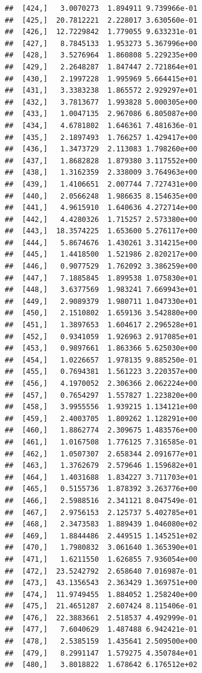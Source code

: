 \documentclass[article]{jss}\usepackage[]{graphicx}\usepackage[]{xcolor}
\makeatletter
\newenvironment{kframe}{%
 \def\at@end@of@kframe{}%
 \ifinner\ifhmode%
  \def\at@end@of@kframe{\end{minipage}}%
  \begin{minipage}{\columnwidth}%
 \fi\fi%
 \def\FrameCommand##1{\hskip\@totalleftmargin \hskip-\fboxsep
 \colorbox{shadecolor}{##1}\hskip-\fboxsep
     \hskip-\linewidth \hskip-\@totalleftmargin \hskip\columnwidth}%
 \MakeFramed {\advance\hsize-\width
   \@totalleftmargin\z@ \linewidth\hsize
   \@setminipage}}%
 {\par\unskip\endMakeFramed%
 \at@end@of@kframe}
\newenvironment{knitrout}{}{} %
\makeatother
\begin{document}
\begin{knitrout}
\begin{kframe}
\begin{verbatim}
##  [424,]   3.0070273  1.894911 9.739966e-01
##  [425,]  20.7812221  2.228017 3.630560e-01
##  [426,]  12.7229842  1.779055 9.633231e-01
##  [427,]   8.7845133  1.953273 5.367996e+00
##  [428,]   3.5276964  1.860808 5.229235e+00
##  [429,]   2.2648287  1.847447 2.721864e+01
##  [430,]   2.1997228  1.995969 5.664415e+01
##  [431,]   3.3383238  1.865572 2.929297e+01
##  [432,]   3.7813677  1.993828 5.000305e+00
##  [433,]   1.0047135  2.967086 6.805087e+00
##  [434,]   4.6781802  1.646361 7.481636e-01
##  [435,]   2.1897493  1.766257 1.429417e+00
##  [436,]   1.3473729  2.113083 1.798260e+00
##  [437,]   1.8682828  1.879380 3.117552e+00
##  [438,]   1.3162359  2.338009 3.764963e+00
##  [439,]   1.4106651  2.007744 7.727431e+00
##  [440,]   2.0566248  1.986635 8.154635e+00
##  [441,]   4.9615910  1.640636 4.272714e+00
##  [442,]   4.4280326  1.715257 2.573380e+00
##  [443,]  18.3574225  1.653600 5.276117e+00
##  [444,]   5.8674676  1.430261 3.314215e+00
##  [445,]   1.4418500  1.521986 2.820217e+00
##  [446,]   0.9077529  1.762092 3.386259e+00
##  [447,]   7.1885845  1.899538 1.075830e+01
##  [448,]   3.6377569  1.983241 7.669943e+01
##  [449,]   2.9089379  1.980711 1.047330e+01
##  [450,]   2.1510802  1.659136 3.542880e+00
##  [451,]   1.3897653  1.604617 2.296528e+01
##  [452,]   0.9341059  1.926963 2.917085e+01
##  [453,]   0.9897661  1.863366 5.625030e+00
##  [454,]   1.0226657  1.978135 9.885250e-01
##  [455,]   0.7694381  1.561223 3.220357e+00
##  [456,]   4.1970052  2.306366 2.062224e+00
##  [457,]   0.7654297  1.557827 1.223820e+00
##  [458,]   3.9955556  1.939215 1.134121e+00
##  [459,]   2.4003705  1.809262 1.128291e+00
##  [460,]   1.8862774  2.309675 1.483576e+00
##  [461,]   1.0167508  1.776125 7.316585e-01
##  [462,]   1.0507307  2.658344 2.091677e+01
##  [463,]   1.3762679  2.579646 1.159682e+01
##  [464,]   1.4031688  1.834227 3.711703e+01
##  [465,]   0.5155736  1.878392 3.263776e+00
##  [466,]   2.5988516  2.341121 8.047549e-01
##  [467,]   2.9756153  2.125737 5.402785e+01
##  [468,]   2.3473583  1.889439 1.046080e+02
##  [469,]   1.8844486  2.449515 1.145251e+02
##  [470,]   1.7980832  3.061640 1.365390e+01
##  [471,]   1.6211550  1.626855 7.936054e+00
##  [472,]  23.5242792  2.658640 7.016987e-01
##  [473,]  43.1356543  2.363429 1.369751e+00
##  [474,]  11.9749455  1.884052 1.258240e+00
##  [475,]  21.4651287  2.607424 8.115406e-01
##  [476,]  22.3883661  2.518537 4.492999e-01
##  [477,]   7.6040629  1.487488 6.942421e-01
##  [478,]   2.5385159  1.435641 2.509500e+00
##  [479,]   8.2991147  1.579275 4.350784e+01
##  [480,]   3.8018822  1.678642 6.176512e+02

\end{verbatim}
\end{kframe}
\end{knitrout}
\end{document}
